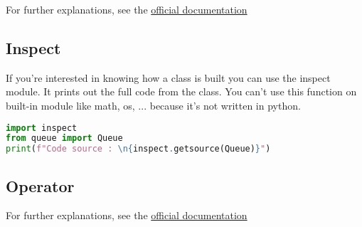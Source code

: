 \documentclass[a4paper, 12pt, titlepage]{scrartcl} %
\begin{document}
\vspace{5mm}

For further explanations, see the \href{https://docs.python.org/3/library/threading.html}{official documentation}


\subsection{Inspect}
If you're interested in knowing how a class is built you can use the inspect module. It prints out the full code from the class. You can't use this function on built-in module like math, os, ... because it's not written in python.
\begin{lstlisting}[language=Python]
import inspect
from queue import Queue
print(f"Code source : \n{inspect.getsource(Queue)}")
\end{lstlisting} \vspace{5mm}

\subsection{Operator}
\label{subsec:Operator}
For further explanations, see the \href{https://docs.python.org/3/library/operator.html}{official documentation}
\end{document}
